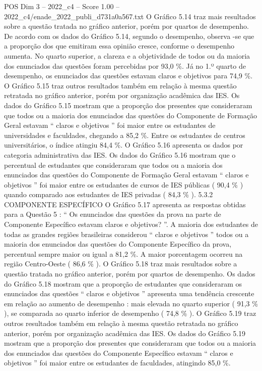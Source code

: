 \begin{textsample}{POS Dim 3 – 2022\_c4 – Score 1.00 – 2022\_c4/enade\_2022\_publi\_d731a0a567.txt}
O Gráfico 5.14 traz mais resultados sobre a questão tratada no gráfico anterior, porém por quartos de desempenho.
De acordo com os dados do Gráfico 5.14, segundo o desempenho, observa -se que a proporção dos que emitiram essa opinião cresce, conforme o desempenho aumenta.
No quarto superior, a clareza e a objetividade de todos ou da maioria dos enunciados das questões foram percebidas por 93,0 \%.
Já no 1.º quarto de desempenho, os enunciados das questões estavam claros e objetivos para 74,9 \%.
O Gráfico 5.15 traz outros resultados também em relação à mesma questão retratada no gráfico anterior, porém por organização acadêmica das IES.
Os dados do Gráfico 5.15 mostram que a proporção dos presentes que consideraram que todos ou a maioria dos enunciados das questões do Componente de Formação Geral estavam “ claros e objetivos ” foi maior entre os estudantes de universidades e faculdades, chegando a 85,2 \%.
Entre os estudantes de centros universitários, o índice atingiu 84,4 \%.
O Gráfico 5.16 apresenta os dados por categoria administrativa das IES.
Os dados do Gráfico 5.16 mostram que o percentual de estudantes que consideraram que todos ou a maioria dos enunciados das questões do Componente de Formação Geral estavam “ claros e objetivos ” foi maior entre os estudantes de cursos de IES públicas ( 90,4 \% ) quando comparado aos estudantes de IES privadas ( 84,3 \% ). 5.3.2 COMPONENTE ESPECÍFICO O Gráfico 5.17 apresenta as respostas obtidas para a Questão 5 : “ Os enunciados das questões da prova na parte de Componente Específico estavam claros e objetivos? ”.
A maioria dos estudantes de todas as grandes regiões brasileiras considerou “ claros e objetivos ” todos ou a maioria dos enunciados das questões do Componente Específico da prova, percentual sempre maior ou igual a 81,2 \%.
A maior porcentagem ocorreu na região Centro-Oeste ( 86,6 \% ).
O Gráfico 5.18 traz mais resultados sobre a questão tratada no gráfico anterior, porém por quartos de desempenho.
Os dados do Gráfico 5.18 mostram que a proporção de estudantes que consideraram os enunciados das questões “ claros e objetivos ” apresenta uma tendência crescente em relação ao aumento de desempenho : mais elevada no quarto superior ( 91,3 \% ), se comparada ao quarto inferior de desempenho ( 74,8 \% ).
O Gráfico 5.19 traz outros resultados também em relação à mesma questão retratada no gráfico anterior, porém por organização acadêmica das IES.
Os dados do Gráfico 5.19 mostram que a proporção dos presentes que consideraram que todos ou a maioria dos enunciados das questões do Componente Específico estavam “ claros e objetivos ” foi maior entre os estudantes de faculdades, atingindo 85,0 \%.

\end{textsample}
